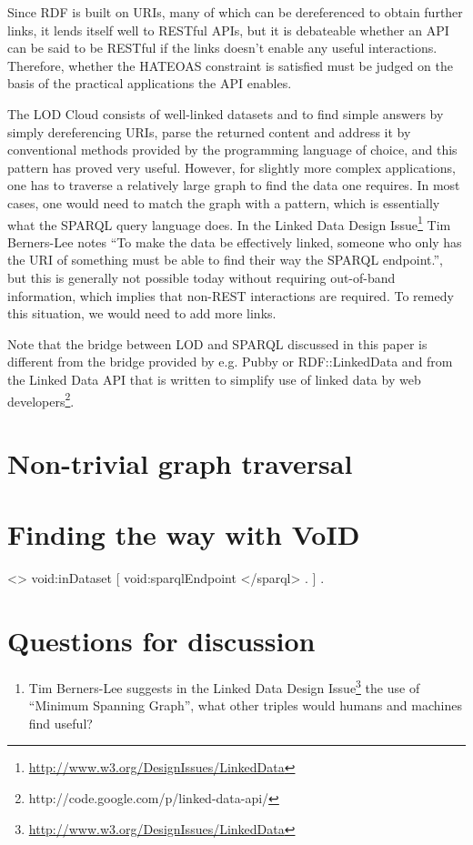 \documentclass{llncs}
\begin{document}
Since RDF is built on URIs, many of which can be dereferenced to
obtain further links, it lends itself well to RESTful APIs, but it is
debateable whether an API can be said to be RESTful if the links
doesn't enable any useful interactions. Therefore, whether the HATEOAS
constraint is satisfied must be judged on the basis of the practical
applications the API enables.

The LOD Cloud consists of well-linked datasets and to find simple
answers by simply dereferencing URIs, parse the returned content and
address it by conventional methods provided by the programming
language of choice, and this pattern has proved very useful. However,
for slightly more complex applications, one has to traverse a
relatively large graph to find the data one requires. In most cases,
one would need to match the graph with a pattern, which is essentially
what the SPARQL query language does. In the Linked Data Design
Issue\footnote{\url{http://www.w3.org/DesignIssues/LinkedData}} Tim
Berners-Lee notes ``To make the data be effectively linked, someone
who only has the URI of something must be able to find their way the
SPARQL endpoint.'', but this is generally not possible today without
requiring out-of-band information, which implies that non-REST
interactions are required. To remedy this situation, we would need to
add more links.

Note that the bridge between LOD and SPARQL discussed in this paper is
different from the bridge provided by e.g. Pubby or RDF::LinkedData
and from the Linked Data API that is written to simplify use of linked
data by web developers\footnote{http://code.google.com/p/linked-data-api/}.

\section{Non-trivial graph traversal}

\section{Finding the way with VoID}


<> void:inDataset [ void:sparqlEndpoint </sparql> . ] .


\section{Questions for discussion}

\begin{enumerate}
\item Tim Berners-Lee suggests in the Linked Data Design
  Issue\footnote{\url{http://www.w3.org/DesignIssues/LinkedData}} the
  use of ``Minimum Spanning Graph'', what other triples would humans
  and machines find useful?

\end{enumerate}



%
%

\end{document}
